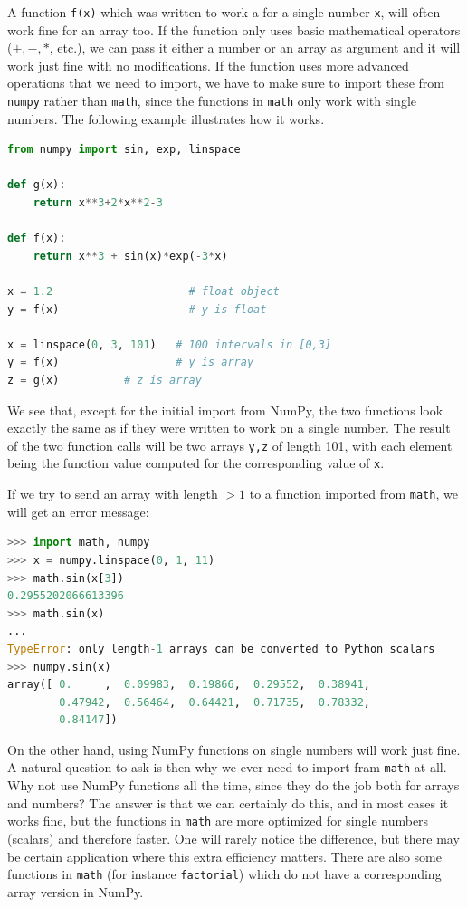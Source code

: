 \documentclass[graybox,envcountchap,sectrefs,final]{svmonodo}
\begin{document}
A function \texttt{f(x)} which was written to work a for a single number \texttt{x}, will often work fine for an array too.
If the function only uses basic mathematical operators ($+,-,*$, etc.), we can pass it either a number or an array as
argument and it will work just fine with no modifications. If the function uses more advanced operations that we
need to import, we have to make sure to import these from \texttt{numpy} rather than \texttt{math}, since the functions in
\texttt{math} only work with single numbers. The following example illustrates how it works.
\begin{lstlisting}[language=Python,style=blue1]
from numpy import sin, exp, linspace

def g(x):
    return x**3+2*x**2-3

def f(x):
    return x**3 + sin(x)*exp(-3*x)

x = 1.2                     # float object
y = f(x)                    # y is float

x = linspace(0, 3, 101)   # 100 intervals in [0,3]
y = f(x)                  # y is array
z = g(x)		  # z is array
\end{lstlisting}
We see that, except for the initial import from NumPy, the two functions look exactly the same as if they were
written to work on a single number. The result of the two function calls will be two arrays \texttt{y,z} of length 101,
with each element being the function value computed for the corresponding value of \texttt{x}.

If we try to send an array with length $>1$ to a function imported from \texttt{math}, we will get an error message:
\begin{lstlisting}[language=Python,style=blue1]
>>> import math, numpy
>>> x = numpy.linspace(0, 1, 11)
>>> math.sin(x[3])
0.2955202066613396
>>> math.sin(x)
...
TypeError: only length-1 arrays can be converted to Python scalars
>>> numpy.sin(x)
array([ 0.     ,  0.09983,  0.19866,  0.29552,  0.38941,
        0.47942,  0.56464,  0.64421,  0.71735,  0.78332,
        0.84147])
\end{lstlisting}
On the other hand, using NumPy functions on single numbers will work just fine. A natural question to ask is then why
we ever need to import fram \texttt{math} at all. Why not  use NumPy functions all the time, since they do the job both
for arrays and numbers? The answer is that we can certainly do this, and in most cases it works fine,
but the functions
in \texttt{math} are more optimized for single numbers (scalars) and therefore faster. One will rarely notice the
difference, but there may be certain application where this extra efficiency matters. There are also some
functions in \texttt{math} (for instance \texttt{factorial}) which do not have a corresponding array version in NumPy.
\end{document}
